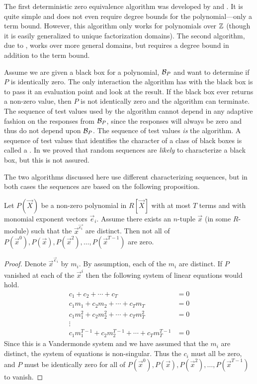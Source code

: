 The first deterministic zero equivalence algorithm was
developed by {\Grigoriev} and {\Karpinski} \cite{Grigorev1987-hs}.  It is
quite simple and does not even require degree bounds for the
polynomial---only a term bound.  However, this algorithm only works for 
polynomials over $\mathbb{Z}$ (though it is easily generalized to unique 
factorization domains).  The second algorithm, due to {\Zippel} 
\cite{Zippel1990-ab}, works over more general domains, but requires a degree 
bound in addition to the term bound. 

Assume we are given a black box for a polynomial, ${\cal B}_P$ and
want to determine if $P$ is identically zero.  The
only interaction the algorithm has with the black box is to pass it an
evaluation point and look at the result.  If the black box ever
returns a non-zero value, then $P$ is not identically zero and the
algorithm can terminate.  The sequence of test values used by the
algorithm cannot depend in any adaptive fashion on the responses from
${\cal B}_P$, since the responses will always be zero and thus do not depend
upon ${\cal B}_P$.  The sequence of test values {\em is} the
algorithm.  A sequence of test values that identifies the character of
a class of black boxes is called a .  In
 we proved that random sequences are
{\em likely} to characterize a black box, but this is not assured.

The two algorithms discussed here use different characterizing
sequences, but in both cases the sequences are based on the following 
proposition.

\begin{proposition}\label{Zero:Mon:Prop}
Let $P(\vec{X})$ be a non-zero polynomial in $R[\vec{X}]$ with at most
$T$ terms and with monomial exponent vectors $\vec{e}_i$.  Assume there
exists an $n$-tuple $\vec{x}$ (in some $R$-module) such that the
$\vec{x}^{\vec{e_i}}$ are distinct.  Then not all of $P(\vec{x}^0),
P(\vec{x}), P(\vec{x}^2), \ldots, P(\vec{x}^{T-1})$ are zero.
\end{proposition}

\begin{proof}
Denote $\vec{x}^{\vec{e}_i}$ by $m_i$.  By assumption, each of the
$m_i$ are distinct.  If $P$ vanished at each of the $\vec{x}^i$ then
the following system of linear equations would hold.
\[
\begin{aligned}
  c_1 + c_2 + \cdots + c_T &= 0 \\
  c_1 m_1 + c_2 m_2 + \cdots + c_T m_T &= 0\\
  c_1 m_1^2 + c_2 m_2^2 + \cdots + c_T m_T^2 &= 0\\ \vdots\\
  c_1 m_1^{T-1} + c_2 m_2^{T-1} + \cdots + c_{T} m_T^{T-1}&=0
\end{aligned}
\]
Since this is a Vandermonde system and we have assumed that the $m_i$
are distinct, the system of equations is non-singular.  Thus the $c_i$
must all be zero, and $P$ must be identically zero for all of
$P(\vec{x}^0), P(\vec{x}), P(\vec{x}^2), \ldots, P(\vec{x}^{T-1})$ to 
vanish.
\end{proof}


